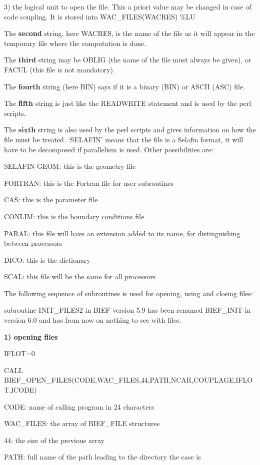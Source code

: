  3) the logical unit to open the file. This a priori value may be changed in case of code coupling. It is stored into WAC\_FILES(WACRES) \%LU

 The \textbf{second} string, here WACRES, is the name of the file as it will appear in the temporary file where the computation is done.

 The \textbf{third} string may be OBLIG (the name of the file must always be given), or FACUL (this file is not mandatory).

 The \textbf{fourth} string (here BIN) says if it is a binary (BIN) or ASCII (ASC) file.

 The \textbf{fifth} string is just like the READWRITE statement and is used by the perl scripts.

 The \textbf{sixth} string is also used by the perl scripts and gives information on how the file must be treated. `SELAFIN' means that the file is a Selafin format, it will have to be decomposed if parallelism is used. Other possibilities are:

 SELAFIN-GEOM: this is the geometry file

 FORTRAN: this is the Fortran file for user subroutines

 CAS: this is the parameter file

 CONLIM: this is the boundary conditions file

 PARAL: this file will have an extension added to its name, for distinguishing between processors

 DICO: this is the dictionary

 SCAL: this file will be the same for all processors

 The following sequence of subroutines is used for opening, using and closing files:

  subroutine INIT\_FILES2 in BIEF version 5.9 has been renamed BIEF\_INIT in version 6.0 and has from now on nothing to see with files.

 \textbf{1) opening files}

 IFLOT=0

 CALL BIEF\_OPEN\_FILES(CODE,WAC\_FILES,44,PATH,NCAR,COUPLAGE,IFLOT,ICODE)

 CODE: name of calling program in 24 characters

 WAC\_FILES: the array of BIEF\_FILE structures

 44: the size of the previous array

 PATH: full name of the path leading to the directory the case is

